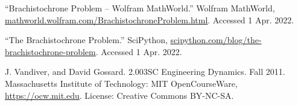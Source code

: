 \renewcommand{\refname}{{Bibliography}}

\begin{thebibliography}{12}

“Brachistochrone Problem -- Wolfram MathWorld.” Wolfram MathWorld, \url{mathworld.wolfram.com/BrachistochroneProblem.html}. Accessed 1 Apr. 2022.

“The Brachistochrone Problem.” SciPython, \url{scipython.com/blog/the-brachistochrone-problem}. Accessed 1 Apr. 2022.

J. Vandiver, and David Gossard. 2.003SC Engineering Dynamics. Fall 2011. Massachusetts Institute of Technology: MIT OpenCourseWare, \url{https://ocw.mit.edu}. License: Creative Commons BY-NC-SA.


\end{thebibliography}


